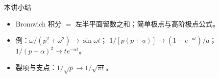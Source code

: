 \documentclass[fontset=windows, chinese, 10pt, xcolor=dvipsnames]{beamer}
\begin{document}
\begin{frame}{本讲小结}
  \begin{itemize}
    \item Bromwich 积分 $=$ 左半平面留数之和；简单极点与高阶极点公式。
    \item 例：$\omega/(p^2+\omega^2)\to\sin\omega t$；
      $1/[p(p+a)]\to(1-e^{-at})/a$；$1/(p+\alpha)^2\to t e^{-\alpha t}$。
    \item 裂项与支点：$1/\sqrt{p}\to 1/\sqrt{\pi t}$。
  \end{itemize}
\end{frame}
\end{document}
